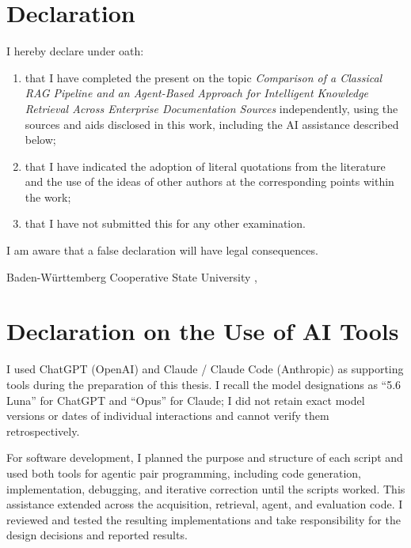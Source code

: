 
\thispagestyle{empty}

\section*{Declaration}

\vspace*{2em}

I hereby declare under oath:
\begin{enumerate}
\item that I have completed the present \arbeit{} on the topic {\itshape Comparison of a Classical RAG Pipeline and an Agent-Based Approach for Intelligent Knowledge Retrieval Across Enterprise Documentation Sources} independently, using the sources and aids disclosed in this work, including the AI assistance described below;
\item that I have indicated the adoption of literal quotations from the literature and the use of the ideas of other authors at the corresponding points within the work;
\item that I have not submitted this \arbeit{} for any other examination.
\end{enumerate}

I am aware that a false declaration will have legal consequences.

\vspace{3em}

Baden-Württemberg Cooperative State University \dhbw, \datumAbgabe

\vspace{4em}

\autor

\clearpage
\section*{Declaration on the Use of AI Tools}

\vspace*{1em}

I used ChatGPT (OpenAI) and Claude / Claude Code (Anthropic) as supporting tools during the preparation of this thesis. I recall the model designations as ``5.6 Luna'' for ChatGPT and ``Opus'' for Claude; I did not retain exact model versions or dates of individual interactions and cannot verify them retrospectively.

For software development, I planned the purpose and structure of each script and used both tools for agentic pair programming, including code generation, implementation, debugging, and iterative correction until the scripts worked. This assistance extended across the acquisition, retrieval, agent, and evaluation code. I reviewed and tested the resulting implementations and take responsibility for the design decisions and reported results.

